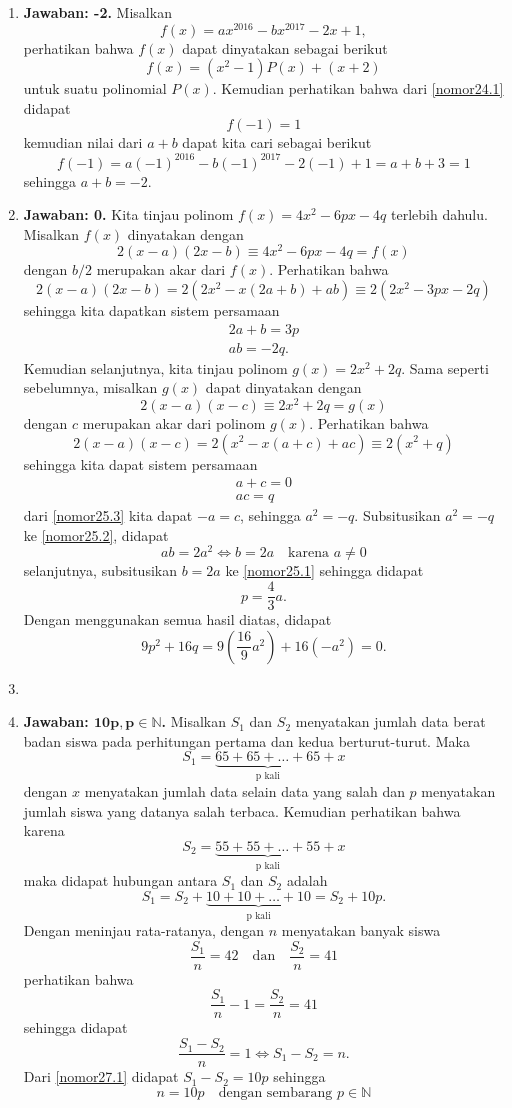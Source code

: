 \begin{enumerate}
\item \textbf{Jawaban: -2.} Misalkan \[f(x) = ax^{2016} - bx^{2017} - 2x + 1,\]perhatikan bahwa $f(x)$ dapat dinyatakan sebagai berikut \begin{equation}\label{nomor24.1}f(x) = (x^2-1)P(x) + (x+2)\end{equation} untuk suatu polinomial $P(x)$. Kemudian perhatikan bahwa dari \eqref{nomor24.1} didapat \[f(-1) = 1\]kemudian nilai dari $a+b$ dapat kita cari sebagai berikut \[f(-1) = a(-1)^{2016} - b(-1)^{2017} - 2(-1) +1 = a+b +3 = 1\]sehingga $a+b = -2.$

\item \textbf{Jawaban: 0.} Kita tinjau polinom $f(x) = 4x^2-6px -4q$ terlebih dahulu. Misalkan $f(x)$ dinyatakan dengan \[2(x-a)(2x-b) \equiv 4x^2-6px - 4q = f(x)\]dengan $b/2$ merupakan akar dari $f(x)$. Perhatikan bahwa \[2(x-a)(2x-b) = 2(2x^2-x(2a+b)+ab)\equiv 2(2x^2-3px-2q)\]sehingga kita dapatkan sistem persamaan
	\begin{gather}
	2a + b = 3p\label{nomor25.1}\\
	ab = -2q\label{nomor25.2}.
	\end{gather}
Kemudian selanjutnya, kita tinjau polinom $g(x) = 2x^2+2q$. Sama seperti sebelumnya, misalkan $g(x)$ dapat dinyatakan dengan $$2(x-a)(x-c) \equiv 2x^2+2q = g(x)$$ dengan $c$ merupakan akar dari polinom $g(x)$. Perhatikan bahwa $$2(x-a)(x-c) = 2(x^2-x(a+c)+ac) \equiv 2(x^2+q)$$ sehingga kita dapat sistem persamaan
	\begin{gather}
	a+c = 0\label{nomor25.3}\\
	ac = q\label{nomor25.4}
	\end{gather}
dari \eqref{nomor25.3} kita dapat $-a = c$, sehingga $a^2 = -q$. Subsitusikan $a^2=-q$ ke \eqref{nomor25.2}, didapat \[ab = 2a^2\Leftrightarrow b = 2a\quad\text{karena $a\neq 0$}\]selanjutnya, subsitusikan $b = 2a$ ke \eqref{nomor25.1} sehingga didapat \[p = \frac{4}{3}a.\]Dengan menggunakan semua hasil diatas, didapat \[9p^2 + 16q = 9\left(\frac{16}{9}a^2\right) + 16(-a^2) = 0.\]

\item

\item \textbf{Jawaban: $\boldsymbol{10p, p\in\mathbb{N}}$.} Misalkan $S_1$ dan $S_2$ menyatakan jumlah data berat badan siswa pada perhitungan pertama dan kedua berturut-turut. Maka \[S_1 = \underbrace{65+65+\ldots+65}_{\text{p kali}} + x\]dengan $x$ menyatakan jumlah data selain data yang salah dan $p$ menyatakan jumlah siswa yang datanya salah terbaca. Kemudian perhatikan bahwa karena \[S_2 = \underbrace{55+55+\ldots+55}_{\text{p kali}} + x\]maka didapat hubungan antara $S_1$ dan $S_2$ adalah \begin{equation}\label{nomor27.1}S_1 = S_2 + \underbrace{10+10+\ldots+10}_{\text{p kali}} = S_2 + 10p.\end{equation}Dengan meninjau rata-ratanya, dengan $n$ menyatakan banyak siswa \[\frac{S_1}{n} = 42\quad\text{dan}\quad\frac{S_2}{n} = 41\]perhatikan bahwa \[\frac{S_1}{n} - 1 = \frac{S_2}{n} = 41\]sehingga didapat \[\frac{S_1 - S_2}{n} = 1\Leftrightarrow S_1 - S_2 = n.\] Dari \eqref{nomor27.1} didapat $S_1 - S_2 = 10p$ sehingga \[n = 10p\quad\text{dengan sembarang $p\in\mathbb{N}$}\]


\end{enumerate}
